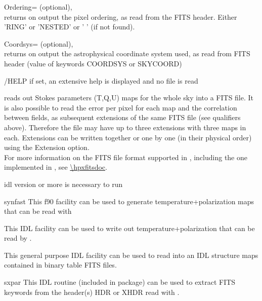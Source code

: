 \begin{qualifiers}
\begin{qulist}{}
	 \item[{Ordering=}] 
	        (optional), \\
	        returns on output the pixel ordering, as read from the FITS
	        header. Either 'RING' or 'NESTED' or ' ' (if not found).

	 \item[{Coordsys=}] 
	        (optional), \\
	        returns on output the astrophysical coordinate system used, 
		as read from FITS header (value of keywords COORDSYS or SKYCOORD)

  \end{qulist}
\end{qualifiers}

\begin{keywords}
  \begin{kwlist}{} %
	\item[{/HELP}]   if set, an extensive help is displayed and no
	file is read
   \end{kwlist}
\end{keywords}

\begin{codedescription}
{\thedocid{} reads out Stokes parameters (T,Q,U) maps for the whole
sky into a FITS file. It is also possible to read the error per pixel for each
map and the correlation between fields, as subsequent extensions of the same FITS
file (see qualifiers above). Therefore the file may have up to three extensions with three
maps in each. Extensions can be written together or one by one (in
their physical order) using the Extension option.\\
For more information on the FITS file format supported in \healpix, 
including the one implemented in \facname,
see \url{\hpxfitsdoc}.}
\end{codedescription}



\begin{related}
  \begin{sulist}{} %
  \item[idl] version \idlversion or more is necessary to run \thedocid
  \item[synfast] This \healpix f90 facility can be used to generate
  temperature+polarization maps that can be read with \thedocid
  \item[\htmlref{write\_tqu}{idl:write_tqu}] This \healpix IDL facility can be used to write
  out temperature+polarization that can be read by \thedocid.

  \item[\htmlref{read\_fits\_s}{idl:read_fits_s}] This general purpose \healpix IDL facility can be used to read
  into an IDL structure maps contained in binary table FITS files.
  \item[sxpar] This IDL routine (included in \healpix package) can be
  used to extract FITS keywords from the header(s) HDR or XHDR read with \thedocid.
  \end{sulist}
\end{related}


